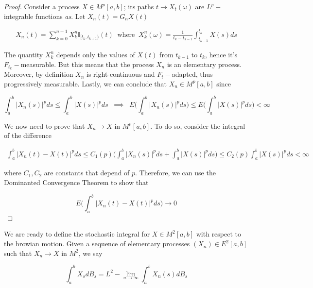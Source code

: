 \begin{proof}
    Consider a process $X \in M^p[a,b]$; its paths $t \to X_t(\omega)$ are $L^p-$integrable functions \textit{as}. Let $X_n(t) = G_n X(t)$

    \begin{gather*}
        X_n(t) = \sum_{k=0}^{n-1} X_k^n \mathbb{I}_{[t_k,t_{k+1})}(t) \;\; \text{where} \;\; X_k^n(\omega) = \frac{1}{t_k-t_{k-1}} \int_{t_{k-1}}^{t_k} X(s) ds
    \end{gather*}

    The quantity $X_k^n$ depends only the values of $X(t)$ from $t_{k-1}$ to $t_k$, hence it's $F_{t_k}-$measurable. But this means that the process $X_n$ is an elementary process. Moreover, by definition $X_n$ is right-continuous and $F_t-$adapted, thus progressively measurable. Lastly, we can conclude that $X_n \in M^p[a,b]$ since 

    \begin{equation*}
        \int_a^b \vert X_n(s) \vert^p ds \leq \int_a^b \vert X(s) \vert^p ds \;\; \implies \;\; E\Bigg(\int_a^b \vert X_n(s) \vert^p ds \Bigg) \leq E\Bigg( \int_a^b \vert X(s) \vert^p ds \Bigg) < \infty 
    \end{equation*}

    We now need to prove that $X_n \to X$ in $M^p[a,b]$. To do so, consider the integral of the difference 

    \begin{gather*}
        \int_a^b \vert X_n(t) - X(t) \vert^p ds \leq C_1(p) \Bigg( \int_a^b \vert X_n(s) \vert^p ds + \int_a^b \vert X(s) \vert^p ds \Bigg) \leq C_2(p) \int_a^b \vert X(s) \vert^p ds < \infty
    \end{gather*}

    where $C_1,C_2$ are constants that depend of $p$. Therefore, we can use the Dominanted Convergence Theorem to show that

    \begin{equation*}
        E\Bigg( \int_a^b \vert X_n(t) - X(t) \vert^p ds \Bigg) \to 0
    \end{equation*}
\end{proof}

We are ready to define the stochastic integral for $X \in M^2[a,b]$ with respect to the browian motion. Given a sequence of elementary processes $(X_n) \in E^2[a,b]$ such that $X_n \to X$ in $M^2$, we say 

\begin{equation}
    \int_a^b X_s dB_s = L^2-\lim_{n \to \infty} \int_a^b X_n(s) dB_s
\end{equation}

